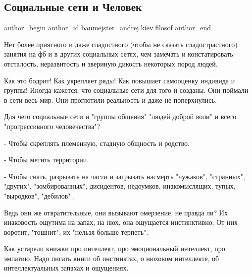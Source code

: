  
 
 
 
 
 
\subsection{Социальные сети и Человек}
\label{sec:03_11_2021.fb.baumejster_andrej.kiev.filosof.1.socseti_chelovek}
 
\ifcmt
 author_begin
   author_id baumejster_andrej.kiev.filosof
 author_end
\fi

Нет более приятного и даже сладостного (чтобы не сказать сладострастного)
занятия на фб и в других социальных сетях, чем замечать и констатировать
отсталость, неразвитость и звериную дикость некоторых пород людей.

Как это бодрит! Как укрепляет ряды! Как повышает самооценку индивида и группы!
Иногда кажется, что социальные сети для того и созданы. Они поймали в сети весь
мир. Они проглотили реальность и даже не поперхнулись.

Для чего социальные сети и "группы общения" "людей доброй воли" и всего
"прогрессивного человечества"? 

- Чтобы скреплять племенную, стадную общность и родство.

- Чтобы метить территории.

- Чтобы гнать, разрывать на части и загрызать насмерть "чужаков", "странных",
"других", "зомбированных", дисидентов, недоумков, инакомыслящих, тупых,
"выродков", "дебилов" .

Ведь они же отвратительные, они вызывают омерзение, не правда ли? Их инаковость
ощутима на запах, на нюх, она ощущается инстинктивно. От них воротит, "тошнит",
их "нельзя больше терпеть". 

Как устарели книжки про интеллект, про эмоциональный интеллект, про эмпатию.
Надо писать книги об инстинктах, о нюховом интеллекте, об интеллектуальных
запахах и ощущениях.

